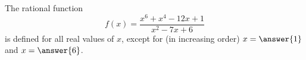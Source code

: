 \documentclass{ximera}
\author{Ivo Terek}
\begin{document}
\begin{exercise}

The rational function $$f(x) = \frac{x^6+x^4-12x+1}{x^2-7x+6}$$ is defined for all real values of $x$, except for (in increasing order) $x = \answer{1}$ and $x = \answer{6}$.

\end{exercise}
\end{document}
